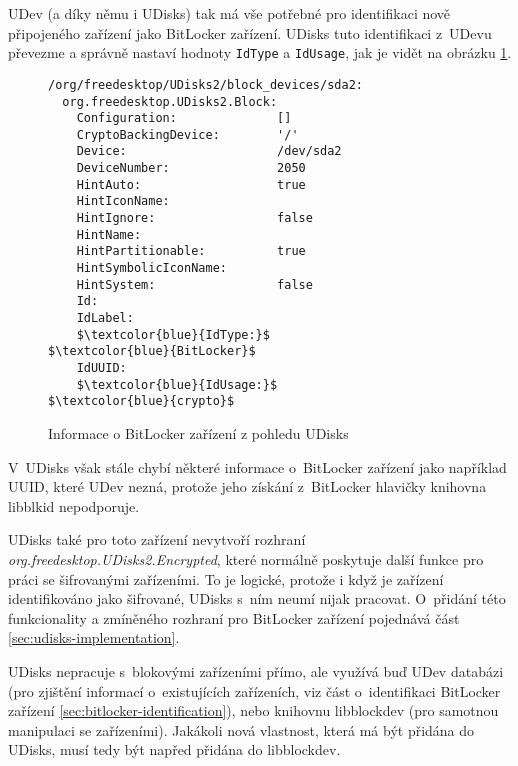 UDev (a díky němu i UDisks) tak má vše potřebné pro identifikaci nově připojeného zařízení jako BitLocker zařízení. UDisks tuto identifikaci z~UDevu převezme a správně nastaví hodnoty \texttt{IdType} a \texttt{IdUsage}, jak je vidět na obrázku \ref{fig:udisks-bitlocker-without-support}.

\begin{figure}[h]
		\centering
		\captionsetup{width=0.65\linewidth}
\begin{center}
\centering
\begin{lstlisting}[frame=none, escapechar=$, basicstyle=\ttfamily\small, columns=fullflexible, keepspaces=true, xleftmargin=.2\textwidth, xrightmargin=.2\textwidth]
/org/freedesktop/UDisks2/block_devices/sda2:
  org.freedesktop.UDisks2.Block:
    Configuration:              []
    CryptoBackingDevice:        '/'
    Device:                     /dev/sda2
    DeviceNumber:               2050
    HintAuto:                   true
    HintIconName:
    HintIgnore:                 false
    HintName:
    HintPartitionable:          true
    HintSymbolicIconName:
    HintSystem:                 false
    Id:
    IdLabel:
    $\textcolor{blue}{IdType:}$                     $\textcolor{blue}{BitLocker}$
    IdUUID:
    $\textcolor{blue}{IdUsage:}$                    $\textcolor{blue}{crypto}$
\end{lstlisting}
\end{center}
		\caption{Informace o BitLocker zařízení z pohledu UDisks}
		\label{fig:udisks-bitlocker-without-support}
\end{figure}

V~UDisks však stále chybí některé informace o~BitLocker zařízení jako například UUID, které UDev nezná, protože jeho získání z~BitLocker hlavičky knihovna libblkid nepodporuje.

UDisks také pro toto zařízení nevytvoří rozhraní \emph{org.freedesktop.UDisks2.Encrypted}, které normálně poskytuje další funkce pro práci se šifrovanými zařízeními. To je logické, protože i když je zařízení identifikováno jako šifrované, UDisks s~ním neumí nijak pracovat. O~přidání této funkcionality a zmíněného rozhraní pro BitLocker zařízení pojednává část \ref{sec:udisks-implementation}.

\label{sec:libblockdev}

UDisks nepracuje s~blokovými zařízeními přímo, ale využívá buď UDev databázi (pro zjištění informací o~existujících zařízeních, viz část o~identifikaci BitLocker zařízení \ref{sec:bitlocker-identification}), nebo knihovnu libblockdev (pro samotnou manipulaci se zařízeními)\cite{Podzimek2017}. Jakákoli nová vlastnost, která má být přidána do UDisks, musí tedy být napřed přidána do libblockdev.

